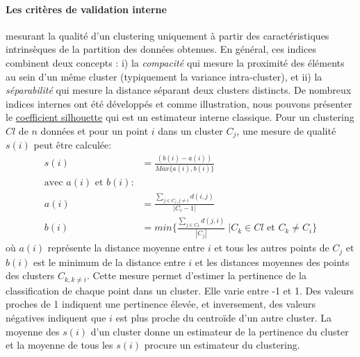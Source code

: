 \paragraph{Les critères de validation interne} \citep{rendon2011internal,gan2007data} mesurant la qualité d'un clustering uniquement à partir des caractéristiques intrinsèques de la partition des données obtenues. En général, ces indices combinent deux concepts \citep{rendon2011internal}: i) la \textit{compacité} qui mesure la proximité des éléments au sein d'un même cluster (typiquement la variance intra-cluster), et ii) la \textit{séparabilité} qui mesure la distance séparant deux clusters distincts. De nombreux indices internes ont été développés \citep{rendon2011internal,gan2007data} et comme illustration, nous pouvons présenter le \underline{coefficient silhouette} \citep{rousseeuw1987silhouettes} qui est un estimateur interne classique. Pour un clustering $Cl$ de $n$ données et pour un point $i$ dans un cluster $C_{j}$, une mesure de qualité $s(i)$ peut être calculée: 
\begin{equation}\label{eqsilhouette}
\begin{split}
s(i)&=\frac{(b(i)-a(i))}{Max\{a(i),b(i)\}}\\
\text{avec $a(i)$ et $b(i)$:}\\
a(i)&=\frac{\sum_{j \in C_{i},j\neq i}d(i,j)}{|C_{i}-1|}\\
b(i)&=min\{\frac{\sum_{j \in C_{k}}d(j,i)}{|C_{j}|}\;| C_{k} \in Cl \textrm{ et } C_{k} \neq C_{i}\}
\end{split}
\end{equation}
où $a(i)$ représente la distance moyenne entre $i$ et tous les autres points de $C_{j}$ et $b(i)$ est le minimum de la distance entre $i$ et les distances moyennes des points des clusters $C_{k,k\neq i}$. Cette mesure permet d'estimer la pertinence de la classification de chaque point dans un cluster. Elle varie entre -1 et 1. Des valeurs proches de 1 indiquent une pertinence élevée, et inversement, des valeurs négatives indiquent que $i$ est plus proche du centroïde d'un autre cluster. La moyenne des $s(i)$ d'un cluster donne un estimateur de la pertinence du cluster et la moyenne de tous les $s(i)$ procure un estimateur du clustering.
